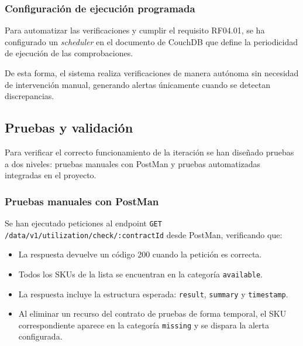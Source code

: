 

\subsubsection{Configuración de ejecución programada}

Para automatizar las verificaciones y cumplir el requisito RF04.01, se ha configurado un \textit{scheduler} en el documento de CouchDB que define la periodicidad de ejecución de las comprobaciones.


De esta forma, el sistema realiza verificaciones de manera autónoma sin necesidad de intervención manual, generando alertas únicamente cuando se detectan discrepancias.

\subsection{Pruebas y validación}

Para verificar el correcto funcionamiento de la iteración se han diseñado pruebas a dos niveles: pruebas manuales con PostMan y pruebas automatizadas integradas en el proyecto.

\subsubsection{Pruebas manuales con PostMan}

Se han ejecutado peticiones al endpoint \texttt{GET /data/v1/utilization/check/:contractId} desde PostMan, verificando que:
\begin{itemize}
    \item La respuesta devuelve un código 200 cuando la petición es correcta.
    \item Todos los SKUs de la lista se encuentran en la categoría \texttt{available}.
    \item La respuesta incluye la estructura esperada: \texttt{result}, \texttt{summary} y \texttt{timestamp}.
    \item Al eliminar un recurso del contrato de pruebas de forma temporal, el SKU correspondiente aparece en la categoría \texttt{missing} y se dispara la alerta configurada.
\end{itemize}



